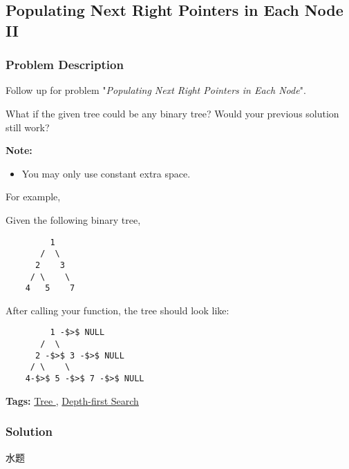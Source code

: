 \documentclass{article}
\begin{document}
\begin{CJK*}{UTF8}{gkai}
\subsection{ Populating Next Right Pointers in Each Node II }
\label{ Populating Next Right Pointers in Each Node II }

\subsubsection*{Problem Description}
Follow up for problem "\emph{Populating Next Right Pointers in Each Node}".

What if the given tree could be any binary tree? Would your previous solution still work?

\textbf{Note:}

\begin{itemize}
\item You may only use constant extra space.
\end{itemize}

For example,


Given the following binary tree,


\begin{verbatim}
         1
       /  \
      2    3
     / \    \
    4   5    7
\end{verbatim}

After calling your function, the tree should look like:


\begin{verbatim}
         1 -$>$ NULL
       /  \
      2 -$>$ 3 -$>$ NULL
     / \    \
    4-$>$ 5 -$>$ 7 -$>$ NULL
\end{verbatim}


\textbf{Tags: }
\hyperref[ Tree ]{ Tree },  \hyperref[ Depth-first Search ]{ Depth-first Search }



\subsubsection*{Solution}
水题


\end{CJK*}
\end{document}
